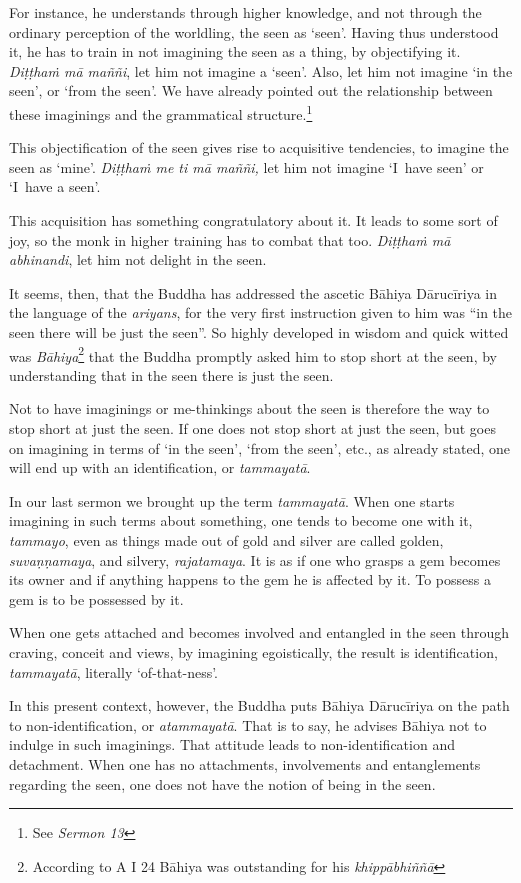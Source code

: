 For instance, he understands through higher knowledge, and not through the ordinary perception of the worldling, the seen as `seen'. Having thus understood it, he has to train in not imagining the seen as a thing, by objectifying it. \emph{Diṭṭhaṁ mā maññi}, let him not imagine a `seen'. Also, let him not imagine `in the seen', or `from the seen'. We have already pointed out the relationship between these imaginings and the grammatical structure.\footnote{See \emph{Sermon 13}}

This objectification of the seen gives rise to acquisitive tendencies, to imagine the seen as `mine'. \emph{Diṭṭhaṁ me ti mā maññi,} let him not imagine `I~have seen' or `I~have a seen'.

This acquisition has something congratulatory about it. It leads to some sort of joy, so the monk in higher training has to combat that too. \emph{Diṭṭhaṁ mā abhinandi}, let him not delight in the seen.

It seems, then, that the Buddha has addressed the ascetic Bāhiya Dārucīriya in the language of the \emph{ariyans}, for the very first instruction given to him was ``in the seen there will be just the seen''. So highly developed in wisdom and quick witted was \emph{Bāhiya}\footnote{According to A I 24 Bāhiya was outstanding for his \emph{khippābhiññā}} that the Buddha promptly asked him to stop short at the seen, by understanding that in the seen there is just the seen.

Not to have imaginings or me-thinkings about the seen is therefore the way to stop short at just the seen. If one does not stop short at just the seen, but goes on imagining in terms of `in the seen', `from the seen', etc., as already stated, one will end up with an identification, or \emph{tammayatā}.

In our last sermon we brought up the term \emph{tammayatā}. When one starts imagining in such terms about something, one tends to become one with it, \emph{tammayo}, even as things made out of gold and silver are called golden, \emph{suvaṇṇamaya}, and silvery, \emph{rajatamaya}. It is as if one who grasps a gem becomes its owner and if anything happens to the gem he is affected by it. To possess a gem is to be possessed by it.

When one gets attached and becomes involved and entangled in the seen through craving, conceit and views, by imagining egoistically, the result is identification, \emph{tammayatā}, literally `of-that-ness'.

In this present context, however, the Buddha puts Bāhiya Dārucīriya on the path to non-identification, or \emph{atammayatā}. That is to say, he advises Bāhiya not to indulge in such imaginings. That attitude leads to non-identification and detachment. When one has no attachments, involvements and entanglements regarding the seen, one does not have the notion of being in the seen.

